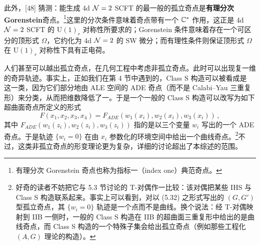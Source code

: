 此外，[48] 猜测：能生成 4d $\mathcal{N}=2$ SCFT 的最一般的孤立奇点是\textbf{有理分次 Gorenstein}奇点。\footnote{有理分次 Gorenstein 奇点也称为指标一（index one）典范奇点。}这里的分次条件意味着奇点带有一个 $\mathbb{C}^*$ 作用，这正是 4d $\mathcal{N}=2$ SCFT 的 $\mathrm{U}(1)_r$ 对称性所要求的；Gorenstein 条件意味着存在一个可区分的顶形式 $\Omega$，它约化为 4d $\mathcal{N}=2$ 的 SW 微分；而有理性条件则保证顶形式 $\Omega$ 在 $\mathrm{U}(1)_r$ 对称性下具有正电荷。


人们甚至可以越出孤立奇点，在几何工程中考虑非孤立奇点。此时可以出现复一维的奇异轨迹。事实上，正如我们在第 4 节中遇到的，Class S 构造可以被看成是
这一类，因为它们部分地由 ALE 空间的 ADE 奇点（而不是 Calabi--Yau 三重复形）来分类，从而把维数降低了一。于是一个一般的 Class S 构造可以改写为如下超曲面奇点所定义的形式
\begin{equation}
F(x_1,x_2,x_3,x_4) = F_{ADE}(w_1(x_i), w_2(x_i), w_3(x_i))\,,
\tag{5.32}
\end{equation}
其中 $F_{ADE}(w_1(z_i),w_2(z_i),w_3(z_i))$ 指的是以三个变量 $w_i$ 写出的一个 ADE 奇点。于是轨迹 $\{w_i=0\}$ 在由 $x_i$ 参数化的环境空间中给出一个曲线奇点。\footnote{好奇的读者不妨把它与 5.3 节讨论的 T-对偶作一比较：该对偶把某些 IHS 与 Class S 构造联系起来。事实上可以看到，对以 (5.32) 之形式写出的 $(G,G')$ 型孤立奇点，其 $\{w_i=0\}$ 轨迹是一个点而不是曲线。换个说法：经 T-对偶映射到 IIB 一侧时，一般的 Class S 构造在 IIB 的超曲面三重复形中给出的是曲线奇点，而 Class S 构造的一个特殊子集会给出孤立奇点（例如那些工程化 $(A,G)$ 理论的构造）。}不过，这类非孤立奇点的形变理论更为复杂，详细的讨论超出了本综述的范围。


